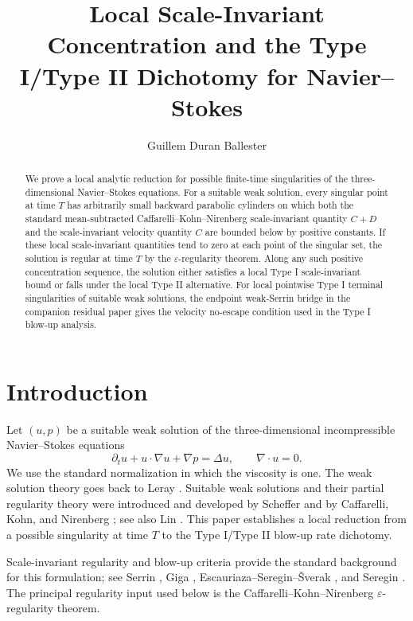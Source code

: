 \documentclass[11pt]{amsart}
\title[Local Concentration for Navier--Stokes]
{Local Scale-Invariant Concentration and the Type I/Type II Dichotomy
for Navier--Stokes}
\author{Guillem Duran Ballester}
\date{}
\theoremstyle{plain}
\theoremstyle{definition}
\theoremstyle{remark}
\begin{document}
\begin{abstract}
We prove a local analytic reduction for possible finite-time singularities of
the three-dimensional Navier--Stokes equations.  For a suitable weak solution,
every singular point at time \(T\) has arbitrarily small backward parabolic
cylinders on which both the standard mean-subtracted
Caffarelli--Kohn--Nirenberg scale-invariant quantity \(C+D\) and the
scale-invariant velocity quantity \(C\) are bounded below by positive
constants.  If these local scale-invariant quantities tend to zero at each
point of the singular set, the solution is regular at time \(T\) by the
\(\varepsilon\)-regularity theorem.  Along any such positive concentration
sequence, the solution either satisfies a local Type I scale-invariant bound or
falls under the local Type II alternative.
For local pointwise Type I terminal singularities of suitable weak solutions,
the endpoint weak-Serrin bridge in the companion residual paper gives the
velocity no-escape condition used in the Type I blow-up analysis.
\end{abstract}

\maketitle

\section{Introduction}

Let \((u,p)\) be a suitable weak solution of the three-dimensional
incompressible Navier--Stokes equations
\[
  \partial_t u+u\cdot\nabla u+\nabla p=\Delta u,
  \qquad \nabla\cdot u=0.
\]
We use the standard normalization in which the viscosity is one.  The weak
solution theory goes back to Leray \cite{Leray1934}.  Suitable weak solutions
and their partial regularity theory were introduced and developed by Scheffer
\cite{Scheffer1976} and by Caffarelli, Kohn, and Nirenberg \cite{CKN1982}; see
also Lin \cite{Lin1998}.  This paper establishes a local reduction from a
possible singularity at time \(T\) to the Type I/Type II blow-up rate
dichotomy.

Scale-invariant regularity and blow-up criteria provide the standard background
for this formulation; see Serrin \cite{Serrin1962}, Giga \cite{Giga1986},
Escauriaza--Seregin--{\v S}verak \cite{ESS2003}, and Seregin
\cite{Seregin2012}.  The principal regularity input used below is the
Caffarelli--Kohn--Nirenberg \(\varepsilon\)-regularity theorem.
\end{document}

